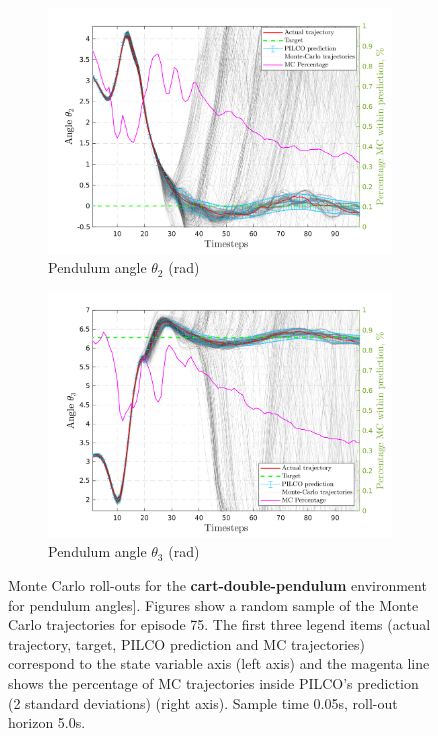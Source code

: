 \begin{figure}[htbp]    
    \begin{subfigure}[b]{1\linewidth}
    \centering
    \includegraphics[height=0.4\textheight,width=1\textwidth]{Chapter3/Figures/cdp_MC_rollout_Ep_80_Dim_5.png} 
    \caption{Pendulum angle $\theta_2$ (rad)} 
    \label{Fig:Re-cdp-angle2} 
  \end{subfigure}
  \hspace{\fill}
  \begin{subfigure}[b]{1\linewidth}
    \centering
    \includegraphics[height=0.4\textheight,width=1\textwidth]{Chapter3/Figures/cdp_MC_rollout_Ep_80_Dim_6.png} 
    \caption{Pendulum angle $\theta_3$ (rad)} 
    \label{Fig:Re-cdp-angle3} 
  \end{subfigure} 
\caption[Monte Carlo roll-outs for \textbf{cart-double-pendulum} pendulum angles]{Monte Carlo roll-outs for the \textbf{cart-double-pendulum} environment for  pendulum angles]. Figures show a random sample of the Monte Carlo trajectories for episode 75. The first three legend items (actual trajectory, target, PILCO prediction and MC trajectories) correspond to the state variable axis (left axis) and the magenta line shows the percentage of MC trajectories inside PILCO's prediction (2 standard deviations) (right axis). Sample time 0.05s, roll-out horizon 5.0s.}
\label{Fig:Re-cdp-MC-roll-outs-3} 
\end{figure} 
 
